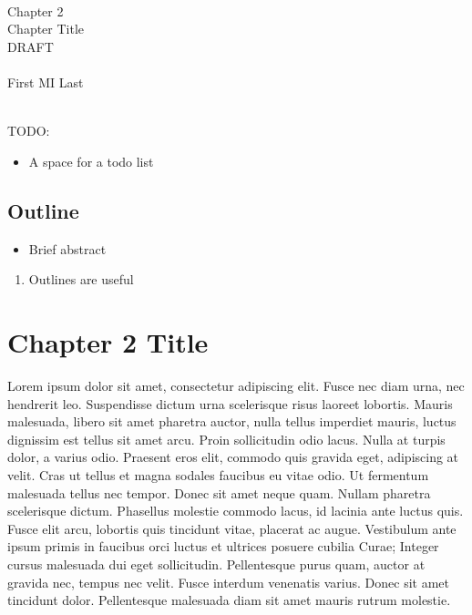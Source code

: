 \documentclass[draftthesis,fullpage,offcenter]{uiucthesis2009}
\begin{document}
		
	\setcounter{chapter}{1}
	\mainmatter
	
	\begin{center}
	~\\~\\~\\
		{\Large Chapter 2\\}
		{\LARGE Chapter Title\\}
		{\Huge DRAFT\\}~\\
		{\Large First MI Last\\}
	\end{center}
	~\\
	{\Large TODO:}
	\begin{itemize}
		\item A space for a todo list
	\end{itemize}

	\thispagestyle{empty}
	\newpage
	
	\section*{Outline}
	
	\begin{itemize}
		\item Brief abstract
	\end{itemize}
	\begin{enumerate}
		\item Outlines are useful
	\end{enumerate}
	
	\thispagestyle{empty}
	\setcounter{page}{\pageref{ch1:end}}
	\newpage
\else
\fi
	
\graphicspath{{./fig_ch2/}}


\chapter{Chapter 2 Title}\label{ch:chapter2_label}

Lorem ipsum dolor sit amet, consectetur adipiscing elit. Fusce nec diam urna, 
nec hendrerit leo. Suspendisse dictum urna scelerisque risus laoreet lobortis. 
Mauris malesuada, libero sit amet pharetra auctor, nulla tellus imperdiet 
mauris, luctus dignissim est tellus sit amet arcu. Proin sollicitudin odio 
lacus. Nulla at turpis dolor, a varius odio. Praesent eros elit, commodo quis 
gravida eget, adipiscing at velit. Cras ut tellus et magna sodales faucibus eu 
vitae odio. Ut fermentum malesuada tellus nec tempor. Donec sit amet neque quam. 
Nullam pharetra scelerisque dictum. Phasellus molestie commodo lacus, id lacinia 
ante luctus quis. Fusce elit arcu, lobortis quis tincidunt vitae, placerat ac 
augue. Vestibulum ante ipsum primis in faucibus orci luctus et ultrices posuere 
cubilia Curae; Integer cursus malesuada dui eget sollicitudin. Pellentesque 
purus quam, auctor at gravida nec, tempus nec velit. Fusce interdum venenatis 
varius. Donec sit amet tincidunt dolor. Pellentesque malesuada diam sit amet 
mauris rutrum molestie.
\end{document}
